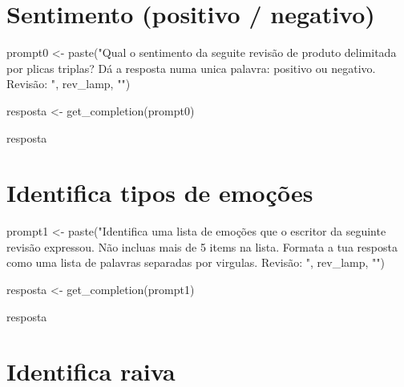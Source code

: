 \documentclass[
  letterpaper,
  paper=6in:9in,
  pagesize=pdftex,
  headinclude=on,
  footinclude=on,
  12pt]{scrbook}
\newenvironment{Shaded}{\begin{snugshade}}{\end{snugshade}}
\newcommand{\FunctionTok}[1]{\textcolor[rgb]{0.28,0.35,0.67}{#1}}
\newcommand{\NormalTok}[1]{\textcolor[rgb]{0.00,0.23,0.31}{#1}}
\newcommand{\OtherTok}[1]{\textcolor[rgb]{0.00,0.23,0.31}{#1}}
\newcommand{\StringTok}[1]{\textcolor[rgb]{0.13,0.47,0.30}{#1}}
\begin{document}
\hypertarget{sentimento-positivo-negativo}{%
\section{Sentimento (positivo /
negativo)}\label{sentimento-positivo-negativo}}

\begin{Shaded}
\begin{Highlighting}[]
\NormalTok{prompt0 }\OtherTok{\textless{}{-}} \FunctionTok{paste}\NormalTok{(}\StringTok{"Qual o sentimento da seguite revisão de produto delimitada por plicas triplas?}
\StringTok{                 Dá a resposta numa unica palavra: positivo ou negativo.}
\StringTok{                 Revisão: \textquotesingle{}\textquotesingle{}\textquotesingle{} "}\NormalTok{, rev\_lamp, }\StringTok{"\textquotesingle{}\textquotesingle{}\textquotesingle{}"}\NormalTok{)}

\NormalTok{resposta }\OtherTok{\textless{}{-}} \FunctionTok{get\_completion}\NormalTok{(prompt0)}

\NormalTok{resposta}
\end{Highlighting}
\end{Shaded}

\hypertarget{identifica-tipos-de-emouxe7uxf5es}{%
\section{Identifica tipos de
emoções}\label{identifica-tipos-de-emouxe7uxf5es}}

\begin{Shaded}
\begin{Highlighting}[]
\NormalTok{prompt1 }\OtherTok{\textless{}{-}} \FunctionTok{paste}\NormalTok{(}\StringTok{"Identifica uma lista de emoções que o escritor da seguinte revisão expressou.}
\StringTok{Não incluas mais de 5 items na lista. Formata a tua resposta como uma lista de palavras separadas por virgulas.}
\StringTok{                 Revisão: \textquotesingle{}\textquotesingle{}\textquotesingle{} "}\NormalTok{, rev\_lamp, }\StringTok{"\textquotesingle{}\textquotesingle{}\textquotesingle{}"}\NormalTok{)}

\NormalTok{resposta }\OtherTok{\textless{}{-}} \FunctionTok{get\_completion}\NormalTok{(prompt1)}

\NormalTok{resposta}
\end{Highlighting}
\end{Shaded}

\hypertarget{identifica-raiva}{%
\section{Identifica raiva}\label{identifica-raiva}}
\end{document}
